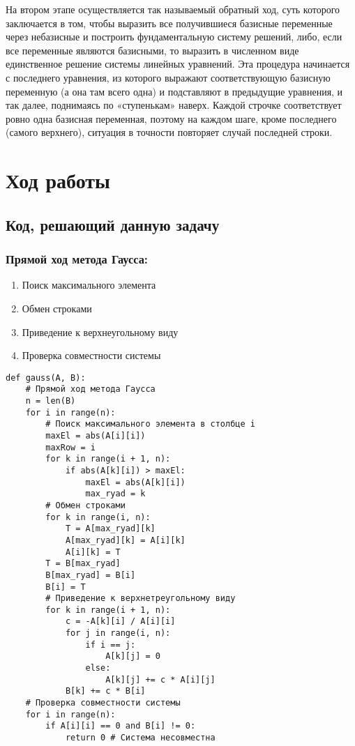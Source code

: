 \documentclass[12pt,a4paper]{scrartcl}
\begin{document}
На втором этапе осуществляется так называемый обратный ход, суть которого заключается в том, чтобы выразить все получившиеся базисные переменные через небазисные и построить фундаментальную систему решений, либо, если все переменные являются базисными, то выразить в численном виде единственное решение системы линейных уравнений. Эта процедура начинается с последнего уравнения, из которого выражают соответствующую базисную переменную (а она там всего одна) и подставляют в предыдущие уравнения, и так далее, поднимаясь по «ступенькам» наверх. Каждой строчке соответствует ровно одна базисная переменная, поэтому на каждом шаге, кроме последнего (самого верхнего), ситуация в точности повторяет случай последней строки.

\section{Ход работы}

\subsection{Код, решающий данную задачу} 
\subsubsection{\textbf{Прямой ход метода Гаусса:}}
\begin{enumerate}
    \item 
        Поиск максимального элемента
    \item 
        Обмен строками
    \item 
        Приведение к верхнеугольному виду
    \item 
        Проверка совместности системы
\end{enumerate}
\begin{verbatim}
def gauss(A, B):
    # Прямой ход метода Гаусса
    n = len(B)
    for i in range(n):
        # Поиск максимального элемента в столбце i
        maxEl = abs(A[i][i])
        maxRow = i
        for k in range(i + 1, n):
            if abs(A[k][i]) > maxEl:
                maxEl = abs(A[k][i])
                max_ryad = k
        # Обмен строками
        for k in range(i, n):
            T = A[max_ryad][k]
            A[max_ryad][k] = A[i][k]
            A[i][k] = T
        T = B[max_ryad]
        B[max_ryad] = B[i]
        B[i] = T
        # Приведение к верхнетреугольному виду
        for k in range(i + 1, n):
            c = -A[k][i] / A[i][i]
            for j in range(i, n):
                if i == j:
                    A[k][j] = 0
                else:
                    A[k][j] += c * A[i][j]
            B[k] += c * B[i]
    # Проверка совместности системы
    for i in range(n):
        if A[i][i] == 0 and B[i] != 0:
            return 0 # Система несовместна
\end{verbatim}
\newpage
\end{document}
